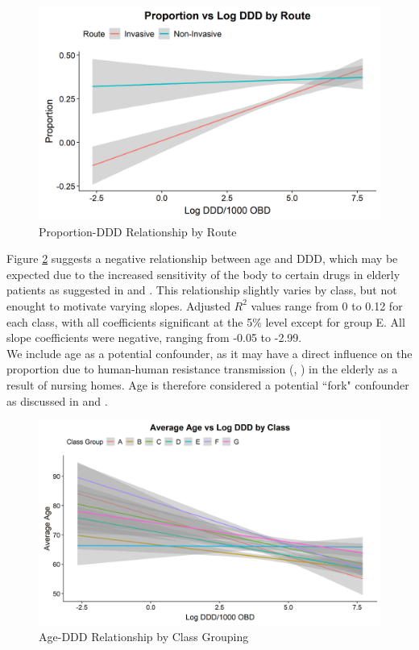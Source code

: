 \documentclass[11pt,twoside]{article}
\numberwithin{Theorem}{section}
\numberwithin{Definition}{section}
\numberwithin{Lemma}{section}
\numberwithin{Algorithm}{section}
\numberwithin{equation}{section}
\begin{document}
\begin{figure}[h!]
	\centering
	\includegraphics[height = 0.18\textheight]{Figures/2_5_1_EDA_RouteProp.png}
	\caption{Proportion-DDD Relationship by Route} \label{fig::EDA_RouteProp}	
\end{figure}

Figure \ref{fig::EDA_Age} suggests a negative relationship between age and DDD, which may be expected due to the increased sensitivity of the body to certain drugs in elderly patients as suggested in \cite{Hughes2002} and \cite{Turnheim1998}. This relationship slightly varies by class, but not enought to motivate varying slopes. Adjusted $R^2$ values range from 0 to 0.12 for each class, with all coefficients significant at the 5\% level except for group E. All slope coefficients were negative, ranging from -0.05 to -2.99. \\

We include age as a potential confounder, as it may have a direct influence on the proportion due to human-human resistance transmission (\citeauthor{Holmes2016}, \citeyear{Holmes2016}) in the elderly as a result of nursing homes. Age is therefore considered a potential ``fork" confounder as discussed in \cite{McElreath_book} and \cite{Pearl}. 

\begin{figure}[h!]
	\centering
	\includegraphics[height = 0.25\textheight]{Figures/2_4_1_EDA_Age.png}
	\caption{Age-DDD Relationship by Class Grouping} \label{fig::EDA_Age}	
\end{figure}
\end{document}
